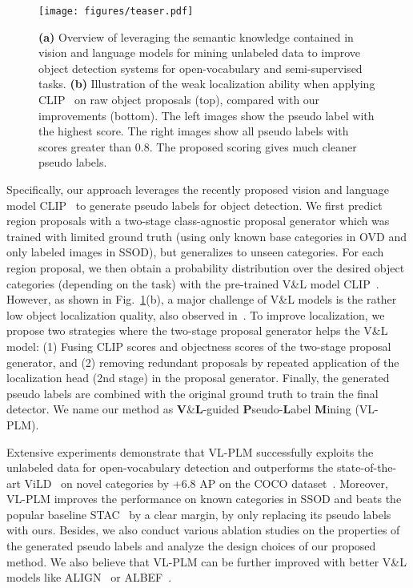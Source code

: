 \documentclass[runningheads]{llncs}
\begin{document}
\begin{figure}[t]\centering
    \texttt{[image: figures/teaser.pdf]}
\caption{\textbf{(a)} Overview of leveraging the semantic knowledge contained in vision and language models for mining unlabeled data to improve object detection systems for open-vocabulary and semi-supervised tasks.
    \textbf{(b)} Illustration of the weak localization ability when applying CLIP~\cite{radford_arxiv_2021} on raw object proposals (top), compared with our improvements (bottom).  The left images show the pseudo label with the highest score.  The right images show all pseudo labels with scores greater than 0.8.  The proposed scoring gives much cleaner pseudo labels.
    }
    \label{fig:teaser}
\end{figure}

Specifically, our approach leverages the recently proposed vision and language model CLIP~\cite{radford_arxiv_2021} to generate pseudo labels for object detection.
We first predict region proposals with a two-stage class-agnostic proposal generator which was trained with limited ground truth (using only known base categories in OVD and only labeled images in SSOD), but generalizes to unseen categories.  For each region proposal, we then obtain a probability distribution over the desired object categories (depending on the task) with the pre-trained V\&L model CLIP~\cite{radford_arxiv_2021}.
However, as shown in Fig.~\ref{fig:teaser}(b), a major challenge of V\&L models is the rather low object localization quality, also observed in~\cite{zhong2021regionclip}. 
To improve localization, we propose two strategies where the two-stage proposal generator helps the V\&L model: (1) Fusing CLIP scores and objectness scores of the two-stage proposal generator, and (2) removing redundant proposals by repeated application of the localization head (2nd stage) in the proposal generator.
Finally, the generated pseudo labels are combined with the original ground truth to train the final detector.  We name our method as \textbf{V}\&\textbf{L}-guided \textbf{P}seudo-\textbf{L}abel \textbf{M}ining (VL-PLM).

Extensive experiments demonstrate that VL-PLM successfully exploits the unlabeled data for open-vocabulary detection and outperforms the state-of-the-art ViLD~\cite{gu_iclr_22} on novel categories by +6.8 AP on the COCO dataset~\cite{COCO}.
Moreover, VL-PLM improves the performance on known categories in SSOD and beats the popular baseline STAC~\cite{sohn2020detection} by a clear margin, by only replacing its pseudo labels with ours. 
Besides, we also conduct various ablation studies on the properties of the generated pseudo labels and analyze the design choices of our proposed method.
We also believe that VL-PLM can be further improved with better V\&L models like ALIGN~\cite{jia_icml_21} or ALBEF~\cite{ALBEF}.
\end{document}
